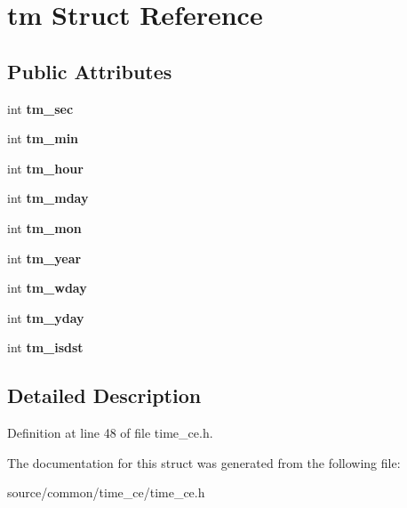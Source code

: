 \hypertarget{structtm}{\section{tm Struct Reference}
\label{structtm}
}
\subsection*{Public Attributes}
\begin{DoxyCompactItemize}
\item 
\hypertarget{structtm_a4d098a9a5c03a00b2ee61e10851de81e}{int {\bfseries tm\-\_\-sec}}\label{structtm_a4d098a9a5c03a00b2ee61e10851de81e}

\item 
\hypertarget{structtm_af414eb7c86cc3099595211eee4d4211b}{int {\bfseries tm\-\_\-min}}\label{structtm_af414eb7c86cc3099595211eee4d4211b}

\item 
\hypertarget{structtm_a3e7ca4e37f1abcaf56b8a916c38eb9fe}{int {\bfseries tm\-\_\-hour}}\label{structtm_a3e7ca4e37f1abcaf56b8a916c38eb9fe}

\item 
\hypertarget{structtm_ab8d8904bad43b0c8b96e61941c5b5310}{int {\bfseries tm\-\_\-mday}}\label{structtm_ab8d8904bad43b0c8b96e61941c5b5310}

\item 
\hypertarget{structtm_a112ac36fa2f593777138a417cf031e17}{int {\bfseries tm\-\_\-mon}}\label{structtm_a112ac36fa2f593777138a417cf031e17}

\item 
\hypertarget{structtm_a33adf78fd6476b2120ce3b9c4a852053}{int {\bfseries tm\-\_\-year}}\label{structtm_a33adf78fd6476b2120ce3b9c4a852053}

\item 
\hypertarget{structtm_afe81a8c46f1c693c43f259b288859f4f}{int {\bfseries tm\-\_\-wday}}\label{structtm_afe81a8c46f1c693c43f259b288859f4f}

\item 
\hypertarget{structtm_a93a0ba77cc23796df84405dcbcc57eb1}{int {\bfseries tm\-\_\-yday}}\label{structtm_a93a0ba77cc23796df84405dcbcc57eb1}

\item 
\hypertarget{structtm_a5645ca0580c8ab2c24f6c2965d9c9f9c}{int {\bfseries tm\-\_\-isdst}}\label{structtm_a5645ca0580c8ab2c24f6c2965d9c9f9c}

\end{DoxyCompactItemize}


\subsection{Detailed Description}


Definition at line 48 of file time\-\_\-ce.\-h.



The documentation for this struct was generated from the following file\-:\begin{DoxyCompactItemize}
\item 
source/common/time\-\_\-ce/time\-\_\-ce.\-h\end{DoxyCompactItemize}
